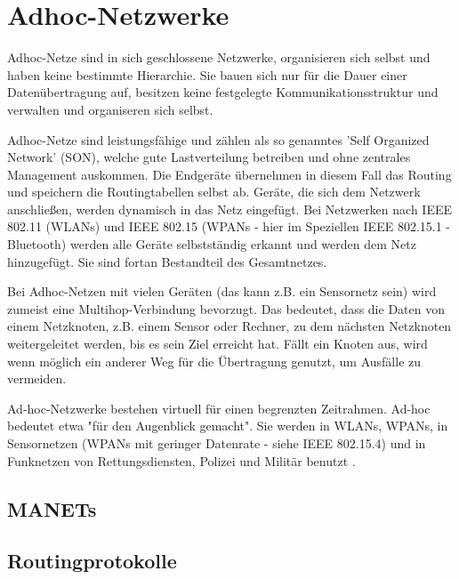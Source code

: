 \section{Adhoc-Netzwerke}\label{s:AdhocNetzwerke}

Adhoc-Netze sind in sich geschlossene Netzwerke, organisieren sich selbst und haben keine bestimmte Hierarchie. Sie bauen sich nur für die Dauer einer Datenübertragung auf, besitzen keine festgelegte Kommunikationsstruktur und verwalten und organiseren sich selbst. 

Adhoc-Netze sind leistungsfähige und zählen als so genanntes 'Self Organized Network' (SON), welche gute Lastverteilung betreiben und ohne zentrales Management auskommen. Die Endgeräte übernehmen in diesem Fall das Routing und speichern die Routingtabellen selbst ab. Geräte, die sich dem Netzwerk anschließen, werden dynamisch in das Netz eingefügt. Bei Netzwerken nach IEEE 802.11 (WLANs) und IEEE 802.15 (WPANs - hier im Speziellen IEEE 802.15.1 - Bluetooth) werden alle Geräte selbstständig erkannt und werden dem Netz hinzugefügt. Sie sind fortan Bestandteil des Gesamtnetzes. 

Bei Adhoc-Netzen mit vielen Geräten (das kann z.B. ein Sensornetz sein) wird zumeist eine Multihop-Verbindung bevorzugt. Das bedeutet, dass die Daten von einem Netzknoten, z.B. einem Sensor oder Rechner, zu dem nächsten Netzknoten weitergeleitet werden, bis es sein Ziel erreicht hat. Fällt ein Knoten aus, wird wenn möglich ein anderer Weg für die Übertragung genutzt, um Ausfälle zu vermeiden.

Ad-hoc-Netzwerke bestehen virtuell für einen begrenzten Zeitrahmen. Ad-hoc bedeutet etwa "für den Augenblick gemacht". Sie werden in WLANs, WPANs, in Sensornetzen (WPANs mit geringer Datenrate - siehe IEEE 802.15.4) und in Funknetzen von Rettungsdiensten, Polizei und Militär benutzt \cite{ws:lipinski}.

\subsection{MANETs}\label{ss:MANETs}
\subsection{Routingprotokolle}\label{ss:Routingprotokolle}